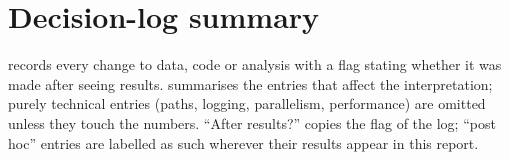 \chapter{Decision-log summary}\label{app:decisionlog}
 records every change to data, code or analysis with a flag stating whether it was made after seeing
results.  summarises the entries that affect the interpretation; purely technical entries (paths, logging,
parallelism, performance) are omitted unless they touch the numbers. ``After results?'' copies the flag of the log; ``post hoc'' entries are
labelled as such wherever their results appear in this report.

